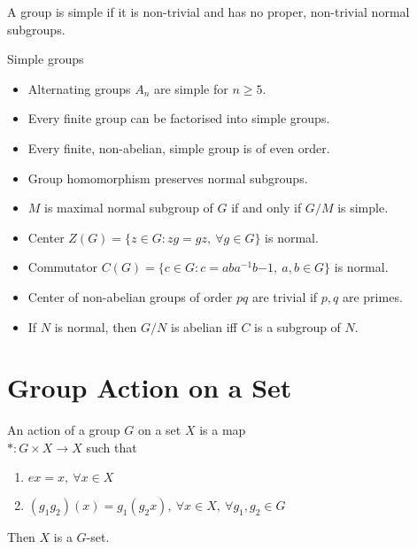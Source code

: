\begin{definition}
	A group is simple if it is non-trivial and has no proper, non-trivial normal subgroups.
\end{definition}
\begin{remark} Simple groups
	\begin{itemize}
		\item Alternating groups $A_n$ are simple for $n \ge 5$. %
		\item Every finite group can be factorised into simple groups. %
		\item Every finite, non-abelian, simple group is of even order. %
		\item Group homomorphism preserves normal subgroups. %
		\item $M$ is maximal normal subgroup of $G$ if and only if $G/M$ is simple. %
		\item Center $Z(G) = \{ z \in G : zg = gz,\ \forall g \in G \}$ is normal. %
		\item Commutator $C(G) = \{ c \in G : c = aba^{-1}b{-1},\ a,b \in G \}$ is normal. %
		\item Center of non-abelian groups of order $pq$ are trivial if $p,q$ are primes. %
		\item If $N$ is normal, then $G/N$ is abelian iff $C$ is a subgroup of $N$. %
	\end{itemize}
\end{remark}

\pagebreak

\section{Group Action on a Set}
\begin{definition}%
	An action of a group $G$ on a set $X$ is a map\\
	$\ast : G \times X \to X$ such that
	\begin{enumerate}
		\item $ex = x,\ \forall x \in X$
		\item $(g_1g_2)(x) = g_1(g_2x),\ \forall x \in X,\ \forall g_1,g_2 \in G$
	\end{enumerate}
	Then $X$ is a $G$-set.
\end{definition}

